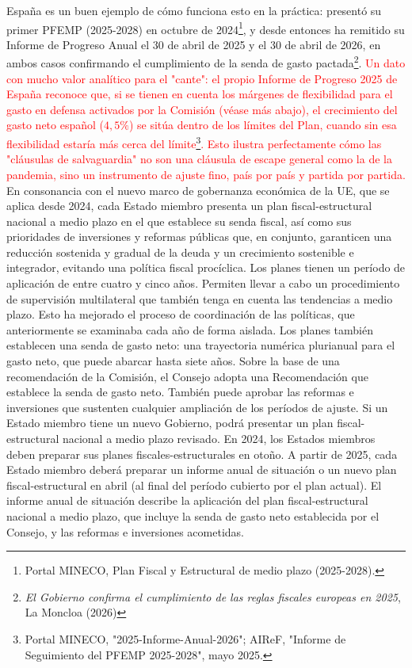 \documentclass[10pt,a4paper]{article}
\begin{document}
España es un buen ejemplo de cómo funciona esto en la práctica: presentó su primer PFEMP (2025-2028) en octubre de 2024\footnote{Portal MINECO, Plan Fiscal y Estructural de medio plazo (2025-2028).}, y desde entonces ha remitido su Informe de Progreso Anual el 30 de abril de 2025 y el 30 de abril de 2026, en ambos casos confirmando el cumplimiento de la senda de gasto pactada\footnote{%
    \textit{El Gobierno confirma el cumplimiento de las reglas fiscales europeas en 2025}, La Moncloa (2026)
}. \textcolor{red}{Un dato con mucho valor analítico para el "cante": el propio Informe de Progreso 2025 de España reconoce que, si se tienen en cuenta los márgenes de flexibilidad para el gasto en defensa activados por la Comisión (véase más abajo), el crecimiento del gasto neto español ($4,5\%$) se sitúa dentro de los límites del Plan, cuando sin esa flexibilidad estaría más cerca del límite\footnote{%
    Portal MINECO, "2025-Informe-Anual-2026"; AIReF, "Informe de Seguimiento del PFEMP 2025-2028", mayo 2025.
}. Esto ilustra perfectamente cómo las "cláusulas de salvaguardia" no son una cláusula de escape general como la de la pandemia, sino un instrumento de ajuste fino, país por país y partida por partida.}
En consonancia con el nuevo marco de gobernanza económica de la UE, que se aplica desde 2024, cada Estado miembro presenta un plan fiscal-estructural nacional a medio plazo en el que establece su senda fiscal, así como sus prioridades de inversiones y reformas públicas que, en conjunto, garanticen una reducción sostenida y gradual de la deuda y un crecimiento sostenible e integrador, evitando una política fiscal procíclica.
Los planes tienen un período de aplicación de entre cuatro y cinco años. Permiten llevar a cabo un procedimiento de supervisión multilateral que también tenga en cuenta las tendencias a medio plazo. Esto ha mejorado el proceso de coordinación de las políticas, que anteriormente se examinaba cada año de forma aislada.
Los planes también establecen una senda de gasto neto: una trayectoria numérica plurianual para el gasto neto, que puede abarcar hasta siete años.
Sobre la base de una recomendación de la Comisión, el Consejo adopta una Recomendación que establece la senda de gasto neto. También puede aprobar las reformas e inversiones que sustenten cualquier ampliación de los períodos de ajuste.
Si un Estado miembro tiene un nuevo Gobierno, podrá presentar un plan fiscal-estructural nacional a medio plazo revisado.
En 2024, los Estados miembros deben preparar sus planes fiscales-estructurales en otoño. A partir de 2025, cada Estado miembro deberá preparar un informe anual de situación o un nuevo plan fiscal-estructural en abril (al final del período cubierto por el plan actual). El informe anual de situación describe la aplicación del plan fiscal-estructural nacional a medio plazo, que incluye la senda de gasto neto establecida por el Consejo, y las reformas e inversiones acometidas.
\end{document}
